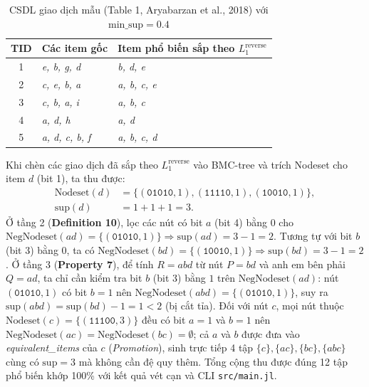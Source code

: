 \documentclass[conference]{IEEEtran}
\begin{document}
\begin{table}[htbp]
\caption{CSDL giao dịch mẫu (Table 1, Aryabarzan et al., 2018) với $\text{min\_sup}=0.4$}
\label{tab:example1}
\centering
\begin{tabular}{@{}cll@{}}
\toprule
\textbf{TID} & \textbf{Các item gốc} & \textbf{Item phổ biến sắp theo $L_1^{\text{reverse}}$} \\
\midrule
1 & \textit{e, b, g, d} & \textit{b, d, e} \\
2 & \textit{c, e, b, a} & \textit{a, b, c, e} \\
3 & \textit{c, b, a, i} & \textit{a, b, c} \\
4 & \textit{a, d, h} & \textit{a, d} \\
5 & \textit{a, d, c, b, f} & \textit{a, b, c, d} \\
\bottomrule
\end{tabular}
\end{table}

Khi chèn các giao dịch đã sắp theo $L_1^{\text{reverse}}$ vào BMC-tree và trích Nodeset cho item $d$ (bit 1), ta thu được:
\begin{align*}
\text{Nodeset}(d) &= \{(\texttt{01010}, 1), (\texttt{11110}, 1), (\texttt{10010}, 1)\}, \\
\text{sup}(d) &= 1 + 1 + 1 = 3.
\end{align*}
Ở tầng 2 (\textbf{Definition 10}), lọc các nút có bit $a$ (bit 4) bằng $0$ cho $\text{NegNodeset}(ad) = \{(\texttt{01010}, 1)\} \Rightarrow \text{sup}(ad) = 3 - 1 = 2$. Tương tự với bit $b$ (bit 3) bằng $0$, ta có $\text{NegNodeset}(bd) = \{(\texttt{10010}, 1)\} \Rightarrow \text{sup}(bd) = 3 - 1 = 2$. Ở tầng 3 (\textbf{Property 7}), để tính $R = abd$ từ nút $P = bd$ và anh em bên phải $Q = ad$, ta chỉ cần kiểm tra bit $b$ (bit 3) bằng $1$ trên $\text{NegNodeset}(ad)$: nút $(\texttt{01010}, 1)$ có bit $b = 1$ nên $\text{NegNodeset}(abd) = \{(\texttt{01010}, 1)\}$, suy ra $\text{sup}(abd) = \text{sup}(bd) - 1 = 1 < 2$ (bị cắt tỉa). Đối với nút $c$, mọi nút thuộc $\text{Nodeset}(c) = \{(\texttt{11100}, 3)\}$ đều có bit $a=1$ và $b=1$ nên $\text{NegNodeset}(ac) = \text{NegNodeset}(bc) = \emptyset$; cả $a$ và $b$ được đưa vào \textit{equivalent\_items} của $c$ (\textit{Promotion}), sinh trực tiếp 4 tập $\{c\}, \{ac\}, \{bc\}, \{abc\}$ cùng có $\text{sup} = 3$ mà không cần đệ quy thêm. Tổng cộng thu được đúng 12 tập phổ biến khớp 100\% với kết quả vét cạn và CLI \texttt{src/main.jl}.
\end{document}
